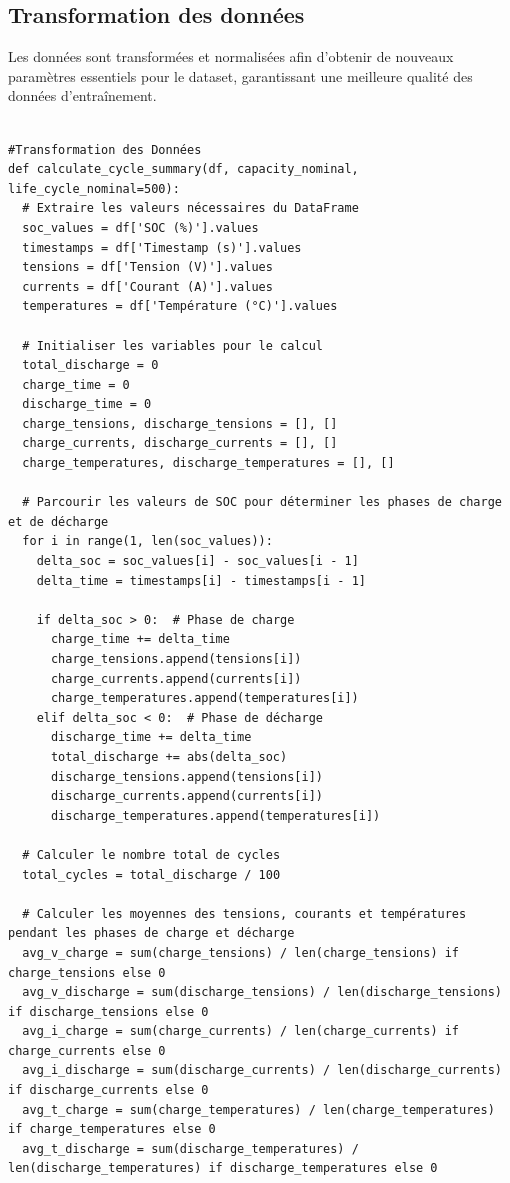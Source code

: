 \subsection{Transformation des données}
Les données sont transformées et normalisées afin d'obtenir de nouveaux paramètres essentiels pour le dataset, garantissant une meilleure qualité des données d'entraînement.
\begin{verbatim}

#Transformation des Données
def calculate_cycle_summary(df, capacity_nominal, life_cycle_nominal=500):
  # Extraire les valeurs nécessaires du DataFrame
  soc_values = df['SOC (%)'].values
  timestamps = df['Timestamp (s)'].values
  tensions = df['Tension (V)'].values
  currents = df['Courant (A)'].values
  temperatures = df['Température (°C)'].values
  
  # Initialiser les variables pour le calcul
  total_discharge = 0
  charge_time = 0
  discharge_time = 0
  charge_tensions, discharge_tensions = [], []
  charge_currents, discharge_currents = [], []
  charge_temperatures, discharge_temperatures = [], []
  	
  # Parcourir les valeurs de SOC pour déterminer les phases de charge et de décharge
  for i in range(1, len(soc_values)):
    delta_soc = soc_values[i] - soc_values[i - 1]
    delta_time = timestamps[i] - timestamps[i - 1]
    
    if delta_soc > 0:  # Phase de charge
      charge_time += delta_time
      charge_tensions.append(tensions[i])
      charge_currents.append(currents[i])
      charge_temperatures.append(temperatures[i])
    elif delta_soc < 0:  # Phase de décharge
      discharge_time += delta_time
      total_discharge += abs(delta_soc)
      discharge_tensions.append(tensions[i])
      discharge_currents.append(currents[i])
      discharge_temperatures.append(temperatures[i])
  
  # Calculer le nombre total de cycles
  total_cycles = total_discharge / 100
  
  # Calculer les moyennes des tensions, courants et températures pendant les phases de charge et décharge
  avg_v_charge = sum(charge_tensions) / len(charge_tensions) if charge_tensions else 0
  avg_v_discharge = sum(discharge_tensions) / len(discharge_tensions) if discharge_tensions else 0
  avg_i_charge = sum(charge_currents) / len(charge_currents) if charge_currents else 0
  avg_i_discharge = sum(discharge_currents) / len(discharge_currents) if discharge_currents else 0
  avg_t_charge = sum(charge_temperatures) / len(charge_temperatures) if charge_temperatures else 0
  avg_t_discharge = sum(discharge_temperatures) / len(discharge_temperatures) if discharge_temperatures else 0
  

\end{verbatim}
